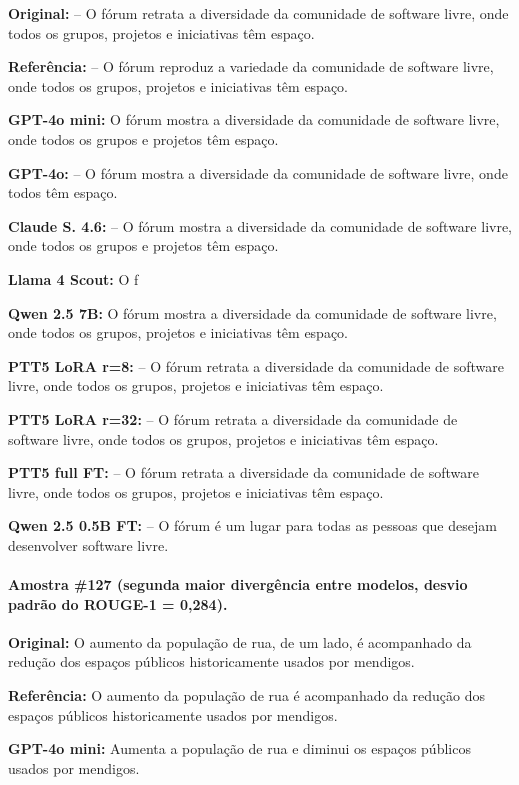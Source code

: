\documentclass[a4paper, twocolumn, 11pt, twoside]{article}
\begin{document}
\textbf{Original:} -- O fórum retrata a diversidade da comunidade de software livre, onde todos os grupos, projetos e iniciativas têm espaço.

\textbf{Referência:} -- O fórum reproduz a variedade da comunidade de software livre, onde todos os grupos, projetos e iniciativas têm espaço.

\textbf{GPT-4o mini:} O fórum mostra a diversidade da comunidade de software livre, onde todos os grupos e projetos têm espaço.

\textbf{GPT-4o:} -- O fórum mostra a diversidade da comunidade de software livre, onde todos têm espaço.

\textbf{Claude S. 4.6:} -- O fórum mostra a diversidade da comunidade de software livre, onde todos os grupos e projetos têm espaço.

\textbf{Llama 4 Scout:} O f

\textbf{Qwen 2.5 7B:} O fórum mostra a diversidade da comunidade de software livre, onde todos os grupos, projetos e iniciativas têm espaço.

\textbf{PTT5 LoRA r=8:} -- O fórum retrata a diversidade da comunidade de software livre, onde todos os grupos, projetos e iniciativas têm espaço.

\textbf{PTT5 LoRA r=32:} -- O fórum retrata a diversidade da comunidade de software livre, onde todos os grupos, projetos e iniciativas têm espaço.

\textbf{PTT5 full FT:} -- O fórum retrata a diversidade da comunidade de software livre, onde todos os grupos, projetos e iniciativas têm espaço.

\textbf{Qwen 2.5 0.5B FT:} -- O fórum é um lugar para todas as pessoas que desejam desenvolver software livre.

\bigskip
\paragraph*{Amostra \#127 (segunda maior divergência entre modelos, desvio padrão do ROUGE-1 = 0,284).}

\textbf{Original:} O aumento da população de rua, de um lado, é acompanhado da redução dos espaços públicos historicamente usados por mendigos.

\textbf{Referência:} O aumento da população de rua é acompanhado da redução dos espaços públicos historicamente usados por mendigos.

\textbf{GPT-4o mini:} Aumenta a população de rua e diminui os espaços públicos usados por mendigos.
\end{document}
